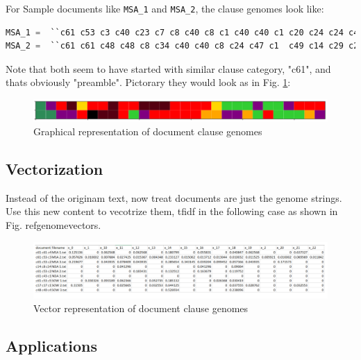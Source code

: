 \documentclass[9pt,academicons]{article}
\begin{document}
For Sample documents like \lstinline|MSA_1| and \lstinline|MSA_2|, the clause genomes look like:
\begin{lstlisting}[language=Python, basicstyle=\footnotesize ]
MSA_1 =  ``c61 c53 c3 c40 c23 c7 c8 c40 c8 c1 c40 c40 c1 c20 c24 c24 c47 c24 c24 c50 c7 c7 c7''
MSA_2 =  ``c61 c61 c48 c48 c8 c34 c40 c40 c8 c24 c47 c1  c49 c14 c29 c2 c30 c24 c30 c9 c53''
\end{lstlisting}

Note that both seem to have started with similar clause category, "c61", and thats obviously "preamble". Pictorary they would look as in Fig. \ref{fig:docclausegenome}:

 \begin{figure}[h!]
 \begin{center}
  \includegraphics[width=\textwidth,keepaspectratio]{img/two_genomes.png}
  \caption{Graphical representation of document clause genomes}
  \label{fig:docclausegenome}
 \end{center}
 \end{figure}


\subsection{Vectorization}
\label{subsec:vecrtorization}

Instead of the originam text, now treat documents are just the genome strings. Use this new content
to vecotrize them,  tfidf  in the following case as shown in Fig. ref{genomevectors}.

 \begin{figure}[h!]
 \begin{center}
  \includegraphics[width=\textwidth]{img/genomevectors.png}
  \caption{Vector representation of document clause genomes}
  \label{fig:genomevectors}
 \end{center}
 \end{figure}


\subsection{Applications}
\label{subsec:application}
\end{document}
